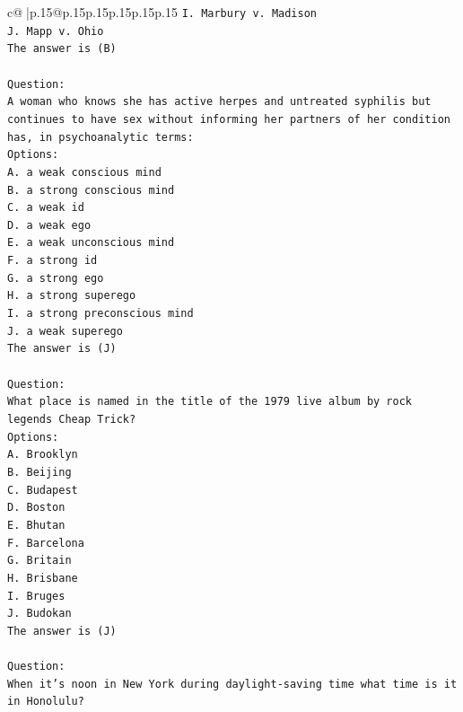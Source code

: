 \documentclass{article}
\begin{document}
{\begin{supertabular}{c@{$\;$}|p{.15\linewidth}@{}p{.15\linewidth}p{.15\linewidth}p{.15\linewidth}p{.15\linewidth}p{.15\linewidth}}
{{{\texttt{I. Marbury v. Madison} \\
\texttt{J. Mapp v. Ohio} \\
\texttt{The answer is (B)} \\
\\ 
\texttt{Question:} \\
\texttt{A woman who knows she has active herpes and untreated syphilis but continues to have sex without informing her partners of her condition has, in psychoanalytic terms:} \\
\texttt{Options:} \\
\texttt{A. a weak conscious mind} \\
\texttt{B. a strong conscious mind} \\
\texttt{C. a weak id} \\
\texttt{D. a weak ego} \\
\texttt{E. a weak unconscious mind} \\
\texttt{F. a strong id} \\
\texttt{G. a strong ego} \\
\texttt{H. a strong superego} \\
\texttt{I. a strong preconscious mind} \\
\texttt{J. a weak superego} \\
\texttt{The answer is (J)} \\
\\ 
\texttt{Question:} \\
\texttt{What place is named in the title of the 1979 live album by rock legends Cheap Trick?} \\
\texttt{Options:} \\
\texttt{A. Brooklyn} \\
\texttt{B. Beijing} \\
\texttt{C. Budapest} \\
\texttt{D. Boston} \\
\texttt{E. Bhutan} \\
\texttt{F. Barcelona} \\
\texttt{G. Britain} \\
\texttt{H. Brisbane} \\
\texttt{I. Bruges} \\
\texttt{J. Budokan} \\
\texttt{The answer is (J)} \\
\\ 
\texttt{Question:} \\
\texttt{When it's noon in New York during daylight{-}saving time what time is it in Honolulu?} \\
}}}
\end{supertabular}}
\end{document}

